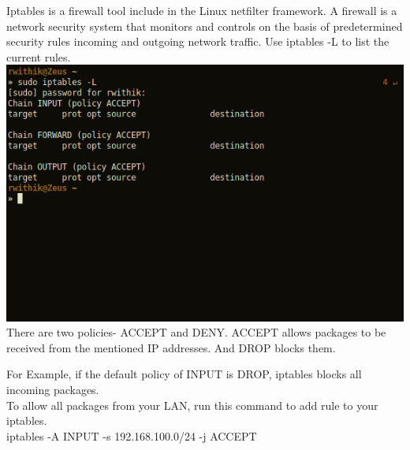 \documentclass[10pt,a4paper]{report}
\begin{document}
\begin{flushleft}
Iptables is a firewall tool include in the Linux netfilter framework. A firewall is a network security system that monitors and controls on the basis of predetermined security rules incoming and outgoing network traffic.
Use {\color{red} iptables -L} to list the current rules.\\
\medskip
\includegraphics[scale=.5]{../Images/Network/6.png}\\
\medskip
There are two policies- ACCEPT and DENY. 
ACCEPT allows packages to be received from the mentioned IP addresses. And DROP blocks them.

For Example, if the default policy of INPUT is DROP, iptables blocks all incoming packages.\\
To allow all packages from your LAN, run this command to add rule to your iptables.\\
iptables -A INPUT -s 192.168.100.0/24 -j ACCEPT\\


\end{flushleft}
\vspace*{\fill}
\pagebreak
\end{document}
